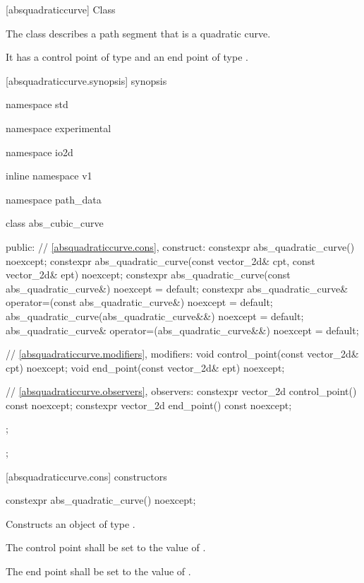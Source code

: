  [absquadraticcurve] {Class }

\pnum
{}
The class  describes a path segment that is a quadratic \bezierlocal curve.

\pnum
It has a control point of type  and an end point of type .

 [absquadraticcurve.synopsis] { synopsis}

\begin{codeblock}
namespace std { namespace experimental { namespace io2d { inline namespace v1 {
  namespace path_data {
    class abs_cubic_curve {
    public:
      // \ref{absquadraticcurve.cons}, construct:
      constexpr abs_quadratic_curve() noexcept;
      constexpr abs_quadratic_curve(const vector_2d& cpt, const vector_2d& ept)
        noexcept;
      constexpr abs_quadratic_curve(const abs_quadratic_curve&)
        noexcept = default;
      constexpr abs_quadratic_curve& operator=(const abs_quadratic_curve&)
        noexcept = default;
      abs_quadratic_curve(abs_quadratic_curve&&) noexcept = default;
      abs_quadratic_curve& operator=(abs_quadratic_curve&&) noexcept = default;

      // \ref{absquadraticcurve.modifiers}, modifiers:
      void control_point(const vector_2d& cpt) noexcept;
      void end_point(const vector_2d& ept) noexcept;

      // \ref{absquadraticcurve.observers}, observers:
      constexpr vector_2d control_point() const noexcept;
      constexpr vector_2d end_point() const noexcept;
    };
  };
} } } }
\end{codeblock}

 [absquadraticcurve.cons] { constructors}

\begin{itemdecl}
constexpr abs_quadratic_curve() noexcept;
\end{itemdecl}
\begin{itemdescr}
	\pnum
	\effects
	Constructs an object of type .
	
	\pnum
	The control point shall be set to the value of .
	
	\pnum
	The end point shall be set to the value of .
\end{itemdescr}

